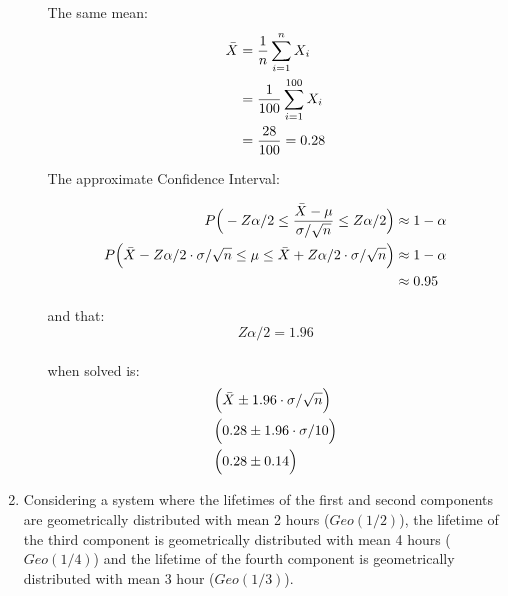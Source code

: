 \documentclass{article}
\begin{document}
\begin{enumerate}
\begin{enumerate}
        The same mean:
        \begin{equation}
            \begin{split}
                \Bar{X} &= \frac{1}{n} \sum_{i=1}^{n} X_i\\
                &= \frac{1}{100} \sum_{i=1}^{100} X_i\\
                &= \frac{28}{100} = 0.28\\
            \end{split}
        \end{equation}

        The approximate Confidence Interval:
        
        \begin{equation}
            \begin{split}
                P\Big(-Z\alpha/2 \leq \frac{\Bar{X}-\mu}{\sigma/\sqrt{n}} \leq Z\alpha/2\Big) &\approx 1-\alpha\\
                P\Big(\Bar{X}-Z\alpha/2 \cdot \sigma/\sqrt{n} \leq \mu \leq \Bar{X}+Z\alpha/2 \cdot \sigma/\sqrt{n}\Big) &\approx 1-\alpha\\ &\approx 0.95\\
            \end{split}
        \end{equation}
        
        and that:
        \begin{equation}
            Z\alpha/2 = 1.96
        \end{equation}\\
        when solved is:
        \begin{equation}
            \begin{split}
                & \Big(\Bar{X}\pm1.96 \cdot \sigma/\sqrt{n} \Big)\\
                & \Big(0.28 \pm1.96 \cdot \sigma/10 \Big)\\
                & \Big(0.28 \pm 0.14\Big)
            \end{split}
        \end{equation}
    \end{enumerate}

\newpage
    \item Considering a system where the lifetimes of the first and second components are geometrically distributed with mean 2 hours ($Geo(1/2)$), the lifetime of the third component is geometrically distributed with mean 4 hours ($Geo(1/4)$) and the lifetime of the fourth component is geometrically distributed with mean 3 hour ($Geo(1/3)$).


\end{enumerate}
\end{document}
